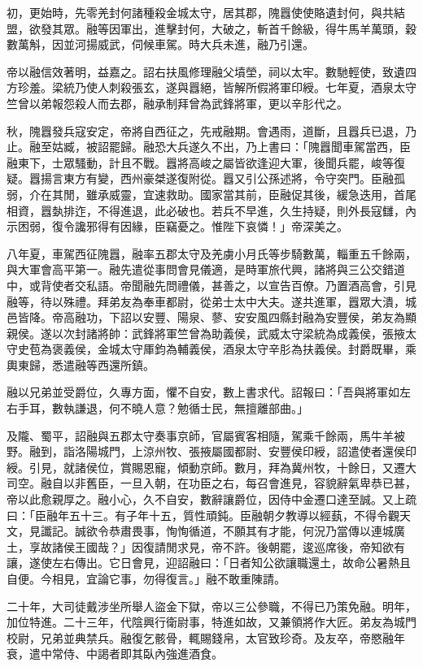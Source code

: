 \begin{pinyinscope}
初，更始時，先零羌封何諸種殺金城太守，居其郡，隗囂使使賂遺封何，與共結盟，欲發其眾。融等因軍出，進擊封何，大破之，斬首千餘級，得牛馬羊萬頭，穀數萬斛，因並河揚威武，伺候車駕。時大兵未進，融乃引還。

帝以融信效著明，益嘉之。詔右扶風修理融父墳塋，祠以太牢。數馳輕使，致遺四方珍羞。梁統乃使人刺殺張玄，遂與囂絕，皆解所假將軍印綬。七年夏，酒泉太守竺曾以弟報怨殺人而去郡，融承制拜曾為武鋒將軍，更以辛肜代之。

秋，隗囂發兵寇安定，帝將自西征之，先戒融期。會遇雨，道斷，且囂兵已退，乃止。融至姑臧，被詔罷歸。融恐大兵遂久不出，乃上書曰：「隗囂聞車駕當西，臣融東下，士眾騷動，計且不戰。囂將高峻之屬皆欲逢迎大軍，後聞兵罷，峻等復疑。囂揚言東方有變，西州豪桀遂復附從。囂又引公孫述將，令守突門。臣融孤弱，介在其閒，雖承威靈，宜速救助。國家當其前，臣融促其後，緩急迭用，首尾相資，囂埶排迮，不得進退，此必破也。若兵不早進，久生持疑，則外長寇讎，內示困弱，復令讒邪得有因緣，臣竊憂之。惟陛下哀憐！」帝深美之。

八年夏，車駕西征隗囂，融率五郡太守及羌虜小月氏等步騎數萬，輜重五千餘兩，與大軍會高平第一。融先遣從事問會見儀適，是時軍旅代興，諸將與三公交錯道中，或背使者交私語。帝聞融先問禮儀，甚善之，以宣告百僚。乃置酒高會，引見融等，待以殊禮。拜弟友為奉車都尉，從弟士太中大夫。遂共進軍，囂眾大潰，城邑皆降。帝高融功，下詔以安豐、陽泉、蓼、安安風四縣封融為安豐侯，弟友為顯親侯。遂以次封諸將帥：武鋒將軍竺曾為助義侯，武威太守梁統為成義侯，張掖太守史苞為褒義侯，金城太守厙鈞為輔義侯，酒泉太守辛肜為扶義侯。封爵既畢，乘輿東歸，悉遣融等西還所鎮。

融以兄弟並受爵位，久專方面，懼不自安，數上書求代。詔報曰：「吾與將軍如左右手耳，數執謙退，何不曉人意？勉循士民，無擅離部曲。」

及隴、蜀平，詔融與五郡太守奏事京師，官屬賓客相隨，駕乘千餘兩，馬牛羊被野。融到，詣洛陽城門，上涼州牧、張掖屬國都尉、安豐侯印綬，詔遣使者還侯印綬。引見，就諸侯位，賞賜恩寵，傾動京師。數月，拜為冀州牧，十餘日，又遷大司空。融自以非舊臣，一旦入朝，在功臣之右，每召會進見，容貌辭氣卑恭已甚，帝以此愈親厚之。融小心，久不自安，數辭讓爵位，因侍中金遷口達至誠。又上疏曰：「臣融年五十三。有子年十五，質性頑鈍。臣融朝夕教導以經蓺，不得令觀天文，見讖記。誠欲令恭肅畏事，恂恂循道，不願其有才能，何況乃當傳以連城廣土，享故諸侯王國哉？」因復請閒求見，帝不許。後朝罷，逡巡席後，帝知欲有讓，遂使左右傳出。它日會見，迎詔融曰：「日者知公欲讓職還土，故命公暑熱且自便。今相見，宜論它事，勿得復言。」融不敢重陳請。

二十年，大司徒戴涉坐所舉人盜金下獄，帝以三公參職，不得已乃策免融。明年，加位特進。二十三年，代陰興行衛尉事，特進如故，又兼領將作大匠。弟友為城門校尉，兄弟並典禁兵。融復乞骸骨，輒賜錢帛，太官致珍奇。及友卒，帝愍融年衰，遣中常侍、中謁者即其臥內強進酒食。


\end{pinyinscope}
